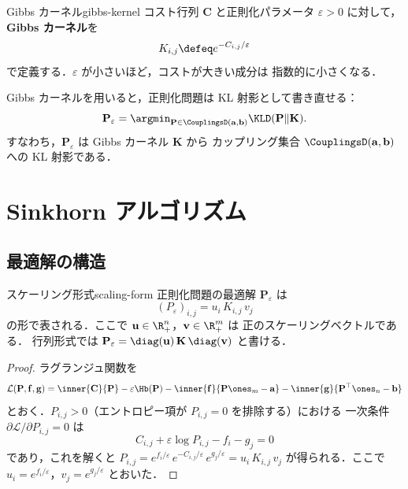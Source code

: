 \begin{definition}{Gibbs カーネル}{gibbs-kernel}
  コスト行列 $\mathbf{C}$ と正則化パラメータ $\varepsilon > 0$ に対して，
  \textbf{Gibbs カーネル}を
  \[
    K_{i,j} \defeq e^{-C_{i,j}/\varepsilon}
  \]
  で定義する．$\varepsilon$ が小さいほど，コストが大きい成分は
  指数的に小さくなる．
\end{definition}

Gibbs カーネルを用いると，正則化問題は KL 射影として書き直せる：
\[
  \mathbf{P}_\varepsilon
  = \argmin_{\mathbf{P} \in \CouplingsD(\mathbf{a}, \mathbf{b})}
  \KLD(\mathbf{P} \| \mathbf{K}).
\]
すなわち，$\mathbf{P}_\varepsilon$ は Gibbs カーネル $\mathbf{K}$ から
カップリング集合 $\CouplingsD(\mathbf{a}, \mathbf{b})$ への KL 射影である．

\section{Sinkhorn アルゴリズム}
\label{sec:sinkhorn}

\subsection{最適解の構造}

\begin{proposition}{スケーリング形式}{scaling-form}
  正則化問題の最適解 $\mathbf{P}_\varepsilon$ は
  \[
    (P_\varepsilon)_{i,j} = u_i \, K_{i,j} \, v_j
  \]
  の形で表される．ここで $\mathbf{u} \in \R_{+}^n$，$\mathbf{v} \in \R_{+}^m$ は
  正のスケーリングベクトルである．
  行列形式では $\mathbf{P}_\varepsilon = \diag(\mathbf{u}) \, \mathbf{K} \, \diag(\mathbf{v})$ と書ける．
\end{proposition}

\begin{proof}
  ラグランジュ関数を
  \[
    \mathcal{L}(\mathbf{P}, \mathbf{f}, \mathbf{g})
    = \inner{\mathbf{C}}{\mathbf{P}} - \varepsilon \Hb(\mathbf{P})
    - \inner{\mathbf{f}}{\mathbf{P}\ones_m - \mathbf{a}}
    - \inner{\mathbf{g}}{\mathbf{P}^\top \ones_n - \mathbf{b}}
  \]
  とおく．$P_{i,j} > 0$（エントロピー項が $P_{i,j} = 0$ を排除する）における
  一次条件 $\partial \mathcal{L} / \partial P_{i,j} = 0$ は
  \[
    C_{i,j} + \varepsilon \log P_{i,j} - f_i - g_j = 0
  \]
  であり，これを解くと
  $P_{i,j} = e^{f_i/\varepsilon} \, e^{-C_{i,j}/\varepsilon} \, e^{g_j/\varepsilon}
  = u_i \, K_{i,j} \, v_j$
  が得られる．ここで $u_i = e^{f_i/\varepsilon}$，$v_j = e^{g_j/\varepsilon}$ とおいた．
\end{proof}

